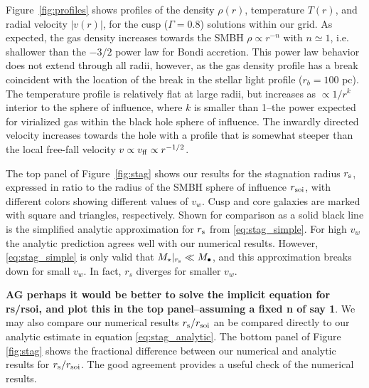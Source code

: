 \documentclass[usenatbib,fleqn]{mn2e}
\newcommand{\rs}{r_s}
\newcommand{\rb}{r_b}
\newcommand{\Mstar}{M_{\star}}
\newcommand{\Mbh}[1][]{M_{\bullet#1}}
\newcommand{\vwO}{v_{w}}
\begin{document}
Figure~\ref{fig:profiles} shows profiles of the density $\rho(r)$,
temperature $T(r)$, and radial velocity $|v(r)|$, for the cusp
($\Gamma=0.8$) solutions within our grid.  As expected, the gas
density increases towards the SMBH $\rho\propto r^{-n}$ with
$n\simeq1$, i.e. shallower than the $-3/2$ power law for
Bondi accretion. This power law behavior does not extend
through all radii, however, as the gas density profile has a break coincident
with the location of the break in the stellar light profile ($\rb=100$
pc). The temperature profile is relatively flat at large radii, but
increases as $\propto 1/r^{k}$ interior to the sphere of influence,
where $k$ is smaller than 1--the power expected for virialized gas within the black hole sphere of influence.
The inwardly directed velocity increases towards the hole with a profile that is somewhat steeper than the local free-fall velocity $v \propto v_{\rm ff}\propto r^{-1/2}$.


The top panel of Figure~\ref{fig:stag} shows our results for the stagnation radius $r_{\rm s}$, expressed in ratio to the radius of the SMBH sphere of influence $r_{\rm soi}$, with different colors showing different values of $v_{w}$.  Cusp and core galaxies are marked with square and triangles, respectively.  Shown for comparison as a solid black line is the simplified analytic approximation for $r_{\rm s}$ from \eqref{eq:stag_simple}. For high $\vwO$ the analytic prediction agrees well with our numerical results. However, \eqref{eq:stag_simple} is only valid that $\Mstar|_{r_{\rm s}} \ll \Mbh$, and
this approximation breaks down for small $\vwO$. In fact, $\rs$
diverges for smaller $\vwO$. 

{\bf AG perhaps it would be better to solve the implicit equation for
  rs/rsoi, and plot this in the top panel--assuming a fixed n of say
  1}. We may also compare our numerical results $r_{\rm s}/r_{\rm
  soi}$ an be compared directly to our analytic estimate in equation
\ref{eq:stag_analytic}.  The bottom panel of Figure \ref{fig:stag}
shows the fractional difference between our numerical and analytic
results for $r_{\rm s}/r_{\rm soi}$.  The good agreement provides a
useful check of the numerical results.

\end{document}
